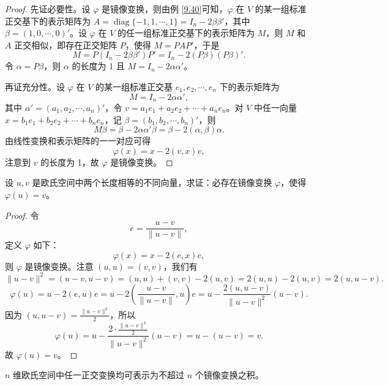 \documentclass[lang=cn,12pt]{elegantbook}
\begin{document}
\begin{proof}
先证必要性。设 \(\varphi\) 是镜像变换，则由例 \ref{9.40}可知，\(\varphi\) 在 \( V \) 的某一组标准正交基下的表示矩阵为 \( A = \operatorname{diag}\{-1, 1, \cdots, 1\} = I_n - 2\beta\beta' \)，其中 \(\beta = (1, 0, \cdots, 0)'\)。设 \(\varphi\) 在 \( V \) 的任一组标准正交基下的表示矩阵为 \( M \)，则 \( M \) 和 \( A \) 正交相似，即存在正交矩阵 \( P \)，使得 \( M = PAP' \)，于是
\[
M = P(I_n - 2\beta\beta')P' = I_n - 2(P\beta)(P\beta)'.
\]
令 \(\alpha = P\beta\)，则 \(\alpha\) 的长度为 1 且 \( M = I_n - 2\alpha\alpha'\)。

再证充分性。设 \(\varphi\) 在 \( V \) 的某一组标准正交基 \( e_1, e_2, \cdots, e_n \) 下的表示矩阵为
\[
M = I_n - 2\alpha\alpha',
\]
其中 \(\alpha' = (a_1, a_2, \cdots, a_n)'\)，令 \( v = a_1e_1 + a_2e_2 + \cdots + a_ne_n \)。对 \( V \) 中任一向量 \( x = b_1e_1 + b_2e_2 + \cdots + b_ne_n \)，记 \(\beta = (b_1, b_2, \cdots, b_n)'\)，则
\[
M\beta = \beta - 2\alpha\alpha'\beta = \beta - 2(\alpha, \beta)\alpha.
\]
由线性变换和表示矩阵的一一对应可得
\[
\varphi(x) = x - 2(v, x)v,
\]
注意到 \( v \) 的长度为 1，故 \(\varphi\) 是镜像变换。
\end{proof}    


\begin{example}\label{9.42}
设 \( u, v \) 是欧氏空间中两个长度相等的不同向量，求证：必存在镜像变换 \(\varphi\)，使得 \(\varphi(u) = v\)。
\end{example}

\begin{proof}
令
\[
e = \frac{u - v}{\|u - v\|},
\]
定义 \(\varphi\) 如下：
\[
\varphi(x) = x - 2(e, x)e,
\]
则 \(\varphi\) 是镜像变换。注意 \((u, u) = (v, v)\)，我们有
\[
\|u - v\|^2 = (u - v, u - v) = (u, u) + (v, v) - 2(u, v) = 2(u, u) - 2(u, v) = 2(u, u - v).
\]
\[
\varphi(u) = u - 2(e, u)e = u - 2\left(\frac{u - v}{\|u - v\|}, u\right) e = u - \frac{2(u, u - v)}{\|u - v\|^2} (u - v).
\]
因为 \((u, u - v) = \frac{\|u - v\|^2}{2}\)，所以
\[
\varphi(u) = u - \frac{2\cdot \frac{\|u - v\|^2}{2}}{\|u - v\|^2} (u - v) = u - (u - v) = v.
\]
故 \(\varphi(u) = v\)。
\end{proof}

\begin{example}\label{9.43}
\( n \) 维欧氏空间中任一正交变换均可表示为不超过 \( n \) 个镜像变换之积。
\end{example}
\end{document}
